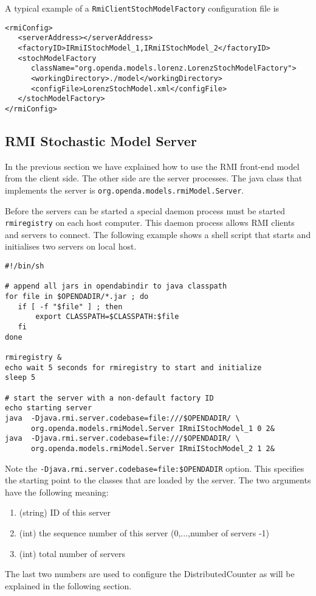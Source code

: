 \documentclass[12pt]{article}
\begin{document}
A typical example of a {\tt RmiClientStochModelFactory} configuration file is
{\small
\begin{verbatim}
<rmiConfig>
   <serverAddress></serverAddress>
   <factoryID>IRmiIStochModel_1,IRmiIStochModel_2</factoryID>
   <stochModelFactory 
      className="org.openda.models.lorenz.LorenzStochModelFactory">
      <workingDirectory>./model</workingDirectory>
      <configFile>LorenzStochModel.xml</configFile>
   </stochModelFactory>
</rmiConfig>
\end{verbatim}
}

\subsection{RMI Stochastic Model Server}
In the previous section we have explained how to use the RMI front-end model from the client side. The other side are the server processes. The java class that implements the server is 
{\tt org.openda.models.rmiModel.Server}. 

Before the servers can be started a special daemon process must be started {\tt rmiregistry} on each host computer. This daemon process allows RMI clients and servers to connect.
The following example shows a shell script that starts and initialises two servers on local host.
{\small
\begin{verbatim}
#!/bin/sh

# append all jars in opendabindir to java classpath
for file in $OPENDADIR/*.jar ; do
   if [ -f "$file" ] ; then
       export CLASSPATH=$CLASSPATH:$file
   fi
done

rmiregistry &
echo wait 5 seconds for rmiregistry to start and initialize
sleep 5

# start the server with a non-default factory ID
echo starting server
java  -Djava.rmi.server.codebase=file:///$OPENDADIR/ \
      org.openda.models.rmiModel.Server IRmiIStochModel_1 0 2&
java  -Djava.rmi.server.codebase=file:///$OPENDADIR/ \ 
      org.openda.models.rmiModel.Server IRmiIStochModel_2 1 2&
\end{verbatim} 
}
Note the {\tt  -Djava.rmi.server.codebase=file:\/\/\/\$OPENDADIR} option. This specifies the starting point to the classes that are loaded by the server. The two arguments have the following meaning:
\begin{enumerate}
\item (string) ID of this server
\item (int) the sequence number of this server (0,...,number of servers -1)
\item (int) total number of servers
\end{enumerate}
The last two numbers are used to configure the DistributedCounter as will be explained in the following section. 
\end{document}
